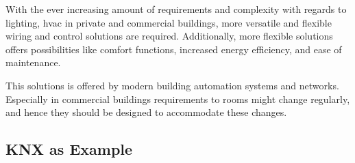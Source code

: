 
\label{sec:background:bas:intro}

With the ever increasing amount of requirements and complexity with regards to lighting, \gls{hvac} in private and commercial buildings, more versatile and flexible wiring and control solutions are required. 
Additionally, more flexible solutions offers possibilities like comfort functions, increased energy efficiency, and ease of maintenance. \parencite{Merz2009}

This solutions is offered by modern building automation systems and networks. Especially in commercial buildings requirements to rooms might change regularly, and hence they should be designed to accommodate these changes. \parencite{Merz2009}


\subsection{KNX as Example}
\label{sec:background:bas:knx}

